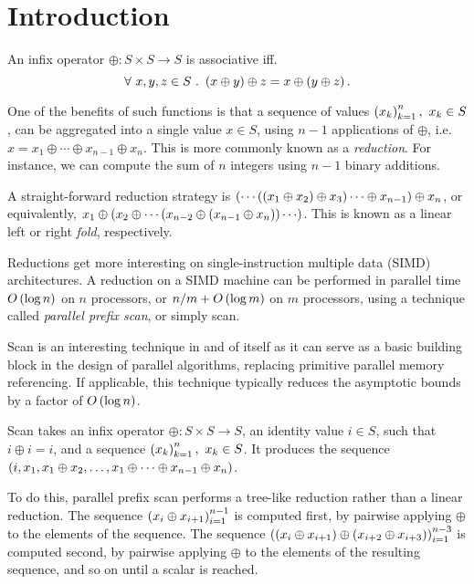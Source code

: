 \section{Introduction}\label{section:introduction}

An infix operator $\oplus:S\times S\rightarrow S$ is associative iff.
\[\forall\ x,y,z\in S\ .\ \p{x \oplus y} \oplus z = x \oplus \p{y \oplus z}.\]

One of the benefits of such functions is that a sequence of values
$\left({x_k}\right)_{k=1}^n,\ x_k\in S$, can be aggregated into a single value $x\in S$,
using $n-1$ applications of $\oplus$, i.e. $x = x_1 \oplus \cdots \oplus
x_{n-1} \oplus x_n$. This is more commonly known as a \emph{reduction}.  For
instance, we can compute the sum of $n$ integers using $n-1$ binary additions.

A straight-forward reduction strategy is $\left({\cdots \left({\left({x_1 \oplus x_2}\right)
\oplus x_3}\right) \cdots \oplus x_{n-1}}\right) \oplus x_n$, or equivalently, $x_1 \oplus
\left({x_2 \oplus \cdots \left({x_{n-2} \oplus \left({x_{n-1} \oplus x_n}\right)}\right) \cdots }\right)$.  This
is known as a linear left or right \emph{fold}, respectively.

Reductions get more interesting on single-instruction multiple data (SIMD)
architectures. A reduction on a SIMD machine can be performed in parallel time
$O\left({\log n}\right)$ on $n$ processors, or ${n/m}+O\left({\log m}\right)$ on $m$ processors,
using a technique called \emph{parallel prefix scan}, or simply scan.

Scan is an interesting technique in and of itself as it can serve as a basic
building block in the design of parallel algorithms, replacing primitive
parallel memory referencing. If applicable, this technique typically reduces
the asymptotic bounds by a factor of $O\left({\log n}\right)$\cite{blelloch}.

Scan takes an infix operator $\oplus:S\times S\rightarrow S$, an identity value
$i\in S$, such that $i\oplus i = i$, and a sequence $\left({x_k}\right)_{k=1}^n,\ x_k\in
S$.  It produces the sequence $\left({i, x_1, x_1 \oplus x_2, \ldots, x_1 \oplus
\cdots \oplus x_{n-1} \oplus x_n}\right)$.

To do this, parallel prefix scan performs a tree-like reduction rather than a
linear reduction. The sequence $\left({x_i \oplus x_{i+1}}\right)_{i=1}^{n-1}$ is computed
first, by pairwise applying $\oplus$ to the elements of the sequence. The
sequence $\left({\left({x_i \oplus x_{i+1}}\right) \oplus \left({x_{i+2} \oplus
x_{i+3}}\right)}\right)_{i=1}^{n-3}$ is computed second, by pairwise applying $\oplus$ to the
elements of the resulting sequence, and so on until a scalar is reached.

